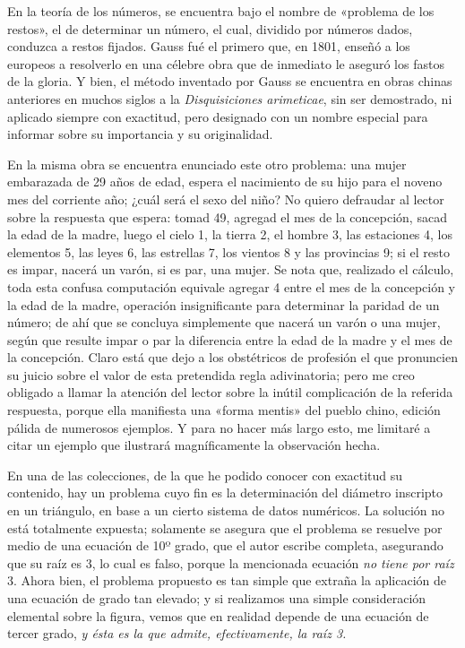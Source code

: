 \documentclass[a4paper, 12pt, draft]{article}
\begin{document}
{En la teoría de los números, se encuentra bajo el nombre de «problema de los restos», el de determinar un número, el cual, dividido por números dados, conduzca a restos fijados. Gauss fué el primero que, en 1801, enseñó a los europeos a resolverlo en una célebre obra que de inmediato le aseguró los fastos de la gloria. Y bien, el método inventado por Gauss se encuentra en obras chinas
anteriores en muchos siglos a la \textit{ Disquisiciones arimeticae}, sin ser demostrado, ni aplicado siempre con
exactitud, pero designado con un nombre especial para informar sobre su importancia y su originalidad.

En la misma obra se encuentra enunciado este otro problema: una mujer embarazada de 29 años de edad, espera el nacimiento de su hijo para el noveno mes del corriente año; ¿cuál será el sexo del niño? No quiero defraudar al lector sobre la respuesta que espera: tomad 49, agregad el mes de la concepción, sacad la edad de la madre, luego el cielo 1, la tierra 2, el hombre 3, las estaciones 4, los elementos 5, las leyes 6, las estrellas 7, los vientos 8 y las provincias 9; si el resto es impar, nacerá un varón, si es par, una mujer. Se nota que, realizado el cálculo, toda esta confusa computación equivale agregar 4 entre el mes de la concepción y la edad de la madre, operación insignificante para determinar la paridad de un número; de ahí  que se concluya simplemente que nacerá  un varón
o una mujer, según que resulte impar o par la diferencia entre la edad de la madre y el mes de la concepción. Claro está que dejo a los obstétricos de profesión el que pronuncien su juicio sobre el valor de esta pretendida regla adivinatoria; pero me creo obligado a llamar la atención del lector sobre la inútil complicación de la referida respuesta, porque ella manifiesta una «forma mentis» del pueblo chino, edición pálida de numerosos ejemplos. Y para no hacer más largo esto, me limitaré a citar un ejemplo que ilustrará magníficamente la observación hecha.

En una de las colecciones, de la que he podido conocer con exactitud su contenido, hay un problema cuyo fin es la determinación del diámetro inscripto en un triángulo, en base a un cierto sistema de datos numéricos. La solución no está totalmente expuesta; solamente se asegura que el problema se resuelve por medio de una ecuación de 10º grado, que el autor escribe completa, asegurando que su raíz es 3, lo cual es falso, porque la mencionada ecuación \textit{ no tiene por raíz} 3. Ahora bien, el problema propuesto es tan simple que extraña la aplicación de una ecuación de grado tan elevado; y si realizamos una simple consideración elemental sobre la figura, vemos que en realidad depende de una ecuación de tercer grado, \textit{ y ésta es la que admite, efectivamente, la raíz 3.}

}
\end{document}
